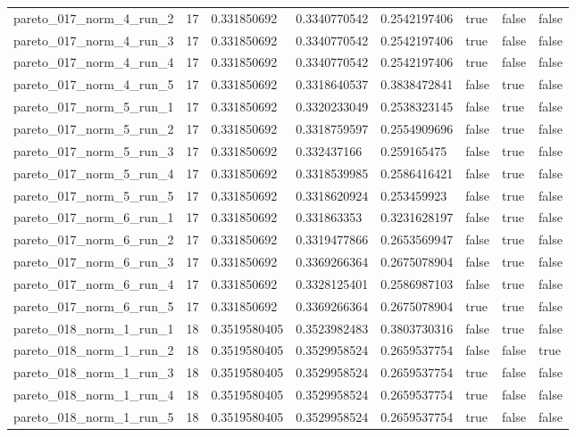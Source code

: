 \begin{tabular}{@{}llllllll@{}}
pareto\_017\_norm\_4\_run\_2 & 17 & 0.331850692 & 0.3340770542 & 0.2542197406 & true & false & false \\
pareto\_017\_norm\_4\_run\_3 & 17 & 0.331850692 & 0.3340770542 & 0.2542197406 & true & false & false \\
pareto\_017\_norm\_4\_run\_4 & 17 & 0.331850692 & 0.3340770542 & 0.2542197406 & true & false & false \\
pareto\_017\_norm\_4\_run\_5 & 17 & 0.331850692 & 0.3318640537 & 0.3838472841 & false & true & false \\
pareto\_017\_norm\_5\_run\_1 & 17 & 0.331850692 & 0.3320233049 & 0.2538323145 & false & true & false \\
pareto\_017\_norm\_5\_run\_2 & 17 & 0.331850692 & 0.3318759597 & 0.2554909696 & false & true & false \\
pareto\_017\_norm\_5\_run\_3 & 17 & 0.331850692 & 0.332437166 & 0.259165475 & false & true & false \\
pareto\_017\_norm\_5\_run\_4 & 17 & 0.331850692 & 0.3318539985 & 0.2586416421 & false & true & false \\
pareto\_017\_norm\_5\_run\_5 & 17 & 0.331850692 & 0.3318620924 & 0.253459923 & false & true & false \\
pareto\_017\_norm\_6\_run\_1 & 17 & 0.331850692 & 0.331863353 & 0.3231628197 & false & true & false \\
pareto\_017\_norm\_6\_run\_2 & 17 & 0.331850692 & 0.3319477866 & 0.2653569947 & false & true & false \\
pareto\_017\_norm\_6\_run\_3 & 17 & 0.331850692 & 0.3369266364 & 0.2675078904 & false & true & false \\
pareto\_017\_norm\_6\_run\_4 & 17 & 0.331850692 & 0.3328125401 & 0.2586987103 & false & true & false \\
pareto\_017\_norm\_6\_run\_5 & 17 & 0.331850692 & 0.3369266364 & 0.2675078904 & true & true & false \\
pareto\_018\_norm\_1\_run\_1 & 18 & 0.3519580405 & 0.3523982483 & 0.3803730316 & false & true & false \\
pareto\_018\_norm\_1\_run\_2 & 18 & 0.3519580405 & 0.3529958524 & 0.2659537754 & false & false & true \\
pareto\_018\_norm\_1\_run\_3 & 18 & 0.3519580405 & 0.3529958524 & 0.2659537754 & true & false & false \\
pareto\_018\_norm\_1\_run\_4 & 18 & 0.3519580405 & 0.3529958524 & 0.2659537754 & true & false & false \\
pareto\_018\_norm\_1\_run\_5 & 18 & 0.3519580405 & 0.3529958524 & 0.2659537754 & true & false & false \\

\end{tabular}

